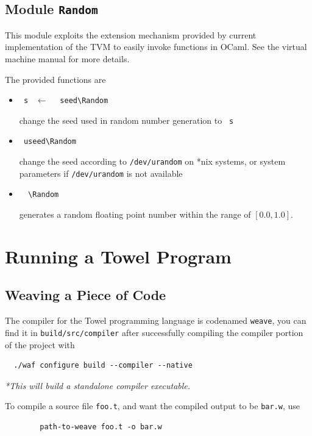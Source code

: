 \documentclass{report}
\newcommand{\mtilde}[1]{\textasciitilde}
\newcommand{\marg}[1]{\texttt{\mtilde ~#1}}
\newcommand{\mla}[0]{~$\leftarrow$ ~}
\begin{document}
\section{Module \texttt{Random}}

This module exploits the extension mechanism provided by current implementation of the TVM to easily invoke functions in OCaml. See the virtual machine manual for more details.

The provided functions are
\begin{itemize}
\item \marg{s} \mla \texttt{\mtilde ~seed\textbackslash Random}

change the seed used in random number generation to \marg{s}
\item \texttt{\mtilde ~useed\textbackslash Random}

change the seed according to \texttt{/dev/urandom} on *nix systems, or system parameters if \texttt{/dev/urandom} is not available
\item \texttt{\mtilde ~\mtilde ~\textbackslash Random}

generates a random floating point number within the range of $[0.0, 1.0]$.
\end{itemize}


\chapter{Running a Towel Program}

\section{Weaving a Piece of Code}

The compiler for the Towel programming language is codenamed \texttt{weave}, you can find it in \texttt{build/src/compiler} after successfully compiling the compiler portion of the project with
\begin{mdframed}[style=example]
\begin{verbatim}
  ./waf configure build --compiler --native
\end{verbatim}

\textit{*This will build a standalone compiler executable.}
\end{mdframed}

To compile a source file \texttt{foo.t}, and want the compiled output to be \texttt{bar.w}, use

\begin{verbatim}
        path-to-weave foo.t -o bar.w
\end{verbatim}
\end{document}
